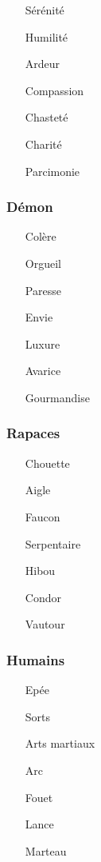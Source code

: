 \begin{itemize}
	\item[Sérénité] 
	\item[Humilité]
	\item[Ardeur]
	\item[Compassion]
	\item[Chasteté]
	\item[Charité]
	\item[Parcimonie]
\end{itemize}

\subsubsection{Démon}

\begin{itemize}
	\item[Colère]
	\item[Orgueil]
	\item[Paresse]
	\item[Envie]
	\item[Luxure]
	\item[Avarice]
	\item[Gourmandise]
\end{itemize}

\subsubsection{Rapaces}

\begin{itemize}
	\item[Chouette]
	\item[Aigle]
	\item[Faucon]
	\item[Serpentaire]
	\item[Hibou]
	\item[Condor]
	\item[Vautour]
\end{itemize}

\subsubsection{Humains}

\begin{itemize}
	\item[Epée]
	\item[Sorts]
	\item[Arts martiaux]
	\item[Arc]
	\item[Fouet]
	\item[Lance]
	\item[Marteau]
\end{itemize}

